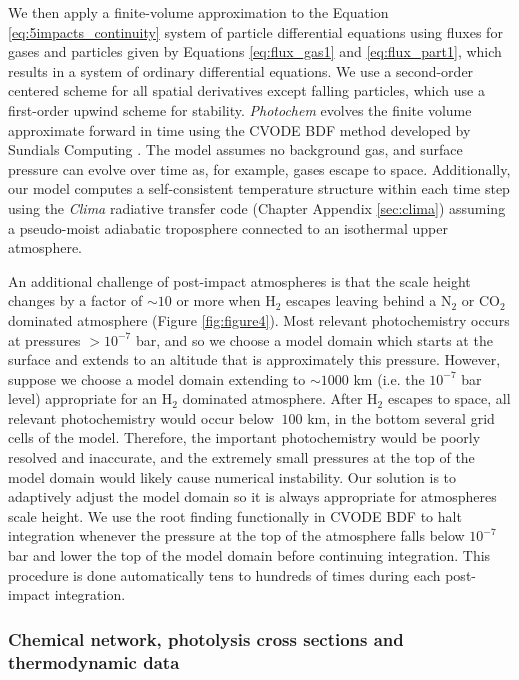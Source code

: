 We then apply a finite-volume approximation to the Equation \eqref{eq:5impacts_continuity} system of particle differential equations using fluxes for gases and particles given by Equations \eqref{eq:flux_gas1} and \eqref{eq:flux_part1}, which results in a system of ordinary differential equations. We use a second-order centered scheme for all spatial derivatives except falling particles, which use a first-order upwind scheme for stability. \emph{Photochem} evolves the finite volume approximate forward in time using the CVODE BDF method developed by Sundials Computing \citep{Hindmarsh_2005}. The model assumes no background gas, and surface pressure can evolve over time as, for example, gases escape to space. Additionally, our model computes a self-consistent temperature structure within each time step using the \emph{Clima} radiative transfer code (Chapter Appendix \ref{sec:clima}) assuming a pseudo-moist adiabatic troposphere connected to an isothermal upper atmosphere.

An additional challenge of post-impact atmospheres is that the scale height changes by a factor of $\sim 10$ or more when H$_2$ escapes leaving behind a N$_2$ or CO$_2$ dominated atmosphere (Figure \ref{fig:figure4}). Most relevant photochemistry occurs at pressures $> 10^{-7}$ bar, and so we choose a model domain which starts at the surface and extends to an altitude that is approximately this pressure. However, suppose we choose a model domain extending to $\sim 1000$ km (i.e. the $10^{-7}$ bar level) appropriate for an H$_2$ dominated atmosphere. After H$_2$ escapes to space, all relevant photochemistry would occur below $~100$ km, in the bottom several grid cells of the model. Therefore, the important photochemistry would be poorly resolved and inaccurate, and the extremely small pressures at the top of the model domain would likely cause numerical instability. Our solution is to adaptively adjust the model domain so it is always appropriate for atmospheres scale height. We use the root finding functionally in CVODE BDF to halt integration whenever the pressure at the top of the atmosphere falls below $10^{-7}$ bar and lower the top of the model domain before continuing integration. This procedure is done automatically tens to hundreds of times during each post-impact integration.

\subsubsection{Chemical network, photolysis cross sections and thermodynamic data} \label{sec:photochem_reactions}

